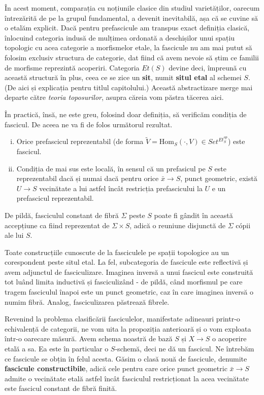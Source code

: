 \documentclass[13pt,openany]{book}
\begin{document}
În acest moment, comparația cu noțiunile clasice din studiul varietăților, oarecum întrezărită de pe la grupul fundamental, a devenit inevitabilă, așa că se cuvine să o etalăm explicit. Dacă pentru prefascicule am transpus exact definiția clasică, înlocuind categoria indusă de mulțimea ordonată a deschișilor unui spațiu topologic cu acea categorie a morfismelor etale, la fascicule nu am mai putut să folosim exclusiv structura de categorie, dat fiind că avem nevoie să știm ce familii de morfisme reprezintă acoperiri. Categoria $Et(S)$ devine deci, împreună cu această structură în plus, ceea ce se zice un {\bf sit}, numit {\bf situl etal} al schemei $S$. (De aici și explicația pentru titlul capitolului.) Această abstractizare merge mai departe către {\it teoria toposurilor}, asupra căreia vom păstra tăcerea aici.

În practică, însă, ne este greu, folosind doar definiția, să verificăm condiția de fascicul. De aceea ne va fi de folos următorul rezultat.

\begin{prop}
\begin{enumerate}[i)]
\item Orice prefascicul reprezentabil (de forma $\widetilde{V} = \text{Hom}_S(\cdot,V) \in Set^{Et_S^{op}}$) este fascicul.
\item Condiția de mai sus este locală, în sensul că un prefasicul pe $S$ este reprezentabil dacă și numai dacă pentru orice $\bar{x} \rightarrow S$, punct geometric, există $U \rightarrow S$ vecinătate a lui astfel încât restricția prefascicului la $U$ e un prefascicul reprezentabil.
\end{enumerate}
\end{prop}

De pildă, fasciculul constant de fibră $\Sigma$ peste $S$ poate fi gândit în această accepțiune ca fiind reprezentat de $\Sigma \times S$, adică o reuniune disjunctă de $\Sigma$ cópii ale lui $S$.

Toate construcțiile cunoscute de la fasciculele pe spații topologice au un corespondent peste situl etal. La fel, subcategoria de fascicule este reflectivă și avem adjunctul de fasciculizare. Imaginea inversă a unui fascicul este construită tot luând limita inductivă și fasciculizând - de pildă, când morfismul pe care tragem fasciculul înapoi este un punct geometric, caz în care imaginea inversă o numim fibră. Analog, fasciculizarea păstrează fibrele.

Revenind la problema clasificării fasciculelor, manifestate adineauri printr-o echivalență de categorii, ne vom uita la propoziția anterioară și o vom exploata într-o oarecare măsură. Avem schema noastră de bază $S$ și $X \rightarrow S$ o acoperire etală a sa. Ea este în particular o $S$-schemă, deci ne dă un fascicul. Ne întrebăm ce fascicule se obțin în felul acesta. Găsim o clasă nouă de fascicule, denumite {\bf fascicule constructibile}, adică cele pentru care orice punct geometric $\bar{x} \rightarrow S$ admite o vecinătate etală astfel încât fasciculul restricționat la acea vecinătate este fascicul constant de fibră finită.
\end{document}
